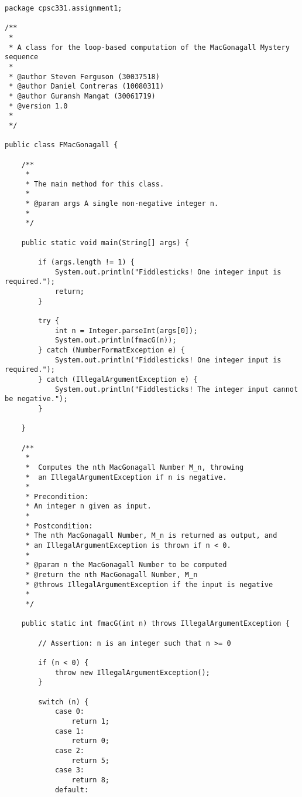 \documentclass[12pt]{article}
\newenvironment{problem}[2][Problem]{\begin{trivlist}
\item[\hskip \labelsep {\bfseries #1}\hskip \labelsep {\bfseries #2.}]}{\end{trivlist}}
\begin{document}
\begin{problem}{13} $\:$
\begin{Verbatim}[fontsize=\small]
package cpsc331.assignment1;

/**
 *
 * A class for the loop-based computation of the MacGonagall Mystery sequence
 *
 * @author Steven Ferguson (30037518)
 * @author Daniel Contreras (10080311)
 * @author Guransh Mangat (30061719)
 * @version 1.0
 *
 */

public class FMacGonagall {

    /**
     *
     * The main method for this class.
     *
     * @param args A single non-negative integer n.
     *
     */

    public static void main(String[] args) {

        if (args.length != 1) {
            System.out.println("Fiddlesticks! One integer input is required.");
            return;
        }

        try {
            int n = Integer.parseInt(args[0]);
            System.out.println(fmacG(n));
        } catch (NumberFormatException e) {
            System.out.println("Fiddlesticks! One integer input is required.");
        } catch (IllegalArgumentException e) {
            System.out.println("Fiddlesticks! The integer input cannot be negative.");
        }

    }

    /**
     *
     *  Computes the nth MacGonagall Number M_n, throwing
     *  an IllegalArgumentException if n is negative.
     *
     * Precondition:
     * An integer n given as input.
     *
     * Postcondition:
     * The nth MacGonagall Number, M_n is returned as output, and
     * an IllegalArgumentException is thrown if n < 0.
     *
     * @param n the MacGonagall Number to be computed
     * @return the nth MacGonagall Number, M_n
     * @throws IllegalArgumentException if the input is negative
     *
     */

    public static int fmacG(int n) throws IllegalArgumentException {

        // Assertion: n is an integer such that n >= 0

        if (n < 0) {
            throw new IllegalArgumentException();
        }

        switch (n) {
            case 0:
                return 1;
            case 1:
                return 0;
            case 2:
                return 5;
            case 3:
                return 8;
            default:


\end{Verbatim}
\end{problem}
\end{document}
